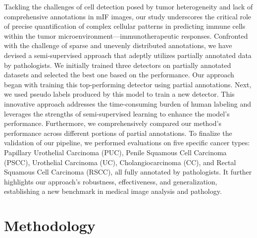 \documentclass{midl} %
\begin{document}
Tackling the challenges of cell detection posed by tumor heterogeneity and lack of comprehensive annotations in mIF images, our study underscores the critical role of precise quantification of complex cellular patterns in predicting immune cells within the tumor microenvironment—immunotherapeutic responses. Confronted with the challenge of sparse and unevenly distributed annotations, we have devised a semi-supervised approach that adeptly utilizes partially annotated data by pathologists. We initially trained three detectors on partially annotated datasets and selected the best one based on the performance. Our approach began with training this top-performing detector using partial annotations. Next, we used pseudo labels produced by this model to train a new detector. This innovative approach addresses the time-consuming burden of human labeling and leverages the strengths of semi-supervised learning to enhance the model's performance. Furthermore, we comprehensively compared our method's performance across different portions of partial annotations. To finalize the validation of our pipeline, we performed evaluations on five specific cancer types: Papillary Urothelial Carcinoma (PUC), Penile Squamous Cell Carcinoma (PSCC), Urothelial Carcinoma (UC), Cholangiocarcinoma (CC), and Rectal Squamous Cell Carcinoma (RSCC), all fully annotated by pathologists. It further highlights our approach's robustness, effectiveness, and generalization, establishing a new benchmark in medical image analysis and pathology.

\section{Methodology}
\label{sec:methodology}
\end{document}
